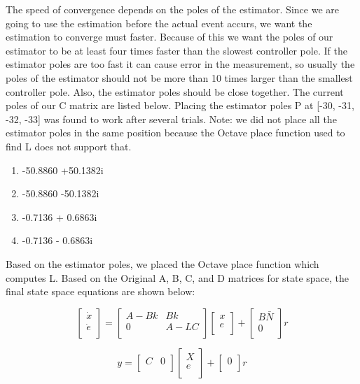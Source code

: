 \documentclass{article}
\begin{document}
\clearpage

The speed of convergence depends on the poles of the estimator. Since we are going to use the estimation before the actual event accurs, we want the estimation to converge must faster. Because of this we want the poles of our estimator to be at least four times faster than the slowest controller pole. If the estimator poles are too fast it can cause error in the measurement, so usually the poles of the estimator should not be more than 10 times larger than the smallest controller pole. Also, the estimator poles should be close together. The current poles of our C matrix are listed below. Placing the estimator poles P at [-30, -31, -32, -33] was found to work after several trials. Note: we did not place all the estimator poles in the same position because the Octave place function used to find L does not support that.
\begin{enumerate}
  \item  -50.8860 +50.1382i
  \item -50.8860 -50.1382i
  \item -0.7136 + 0.6863i
  \item -0.7136 - 0.6863i
\end{enumerate}

Based on the estimator poles, we placed the Octave place function which computes L. Based on the Original A, B, C, and D matrices for state space, the final state space equations are shown below:

\begin{equation}
\label{ss3}
\begin{bmatrix}
\dot{x}\\
\dot{e}\\
\end{bmatrix}
=
\begin{bmatrix}
A-Bk&Bk\\
0&A-LC\\
\end{bmatrix}
\begin{bmatrix}
x\\
e\\
\end{bmatrix} +
\begin{bmatrix}
B\bar{N}\\
0\\
\end{bmatrix} r
\end{equation}

\begin{equation}
\label{ss4}
y = 
\begin{bmatrix}
C&0\\
\end{bmatrix}
\begin{bmatrix}
X\\
e\\
\end{bmatrix} +
\begin{bmatrix}
0\\
\end{bmatrix} r
\end{equation}
\end{document}
